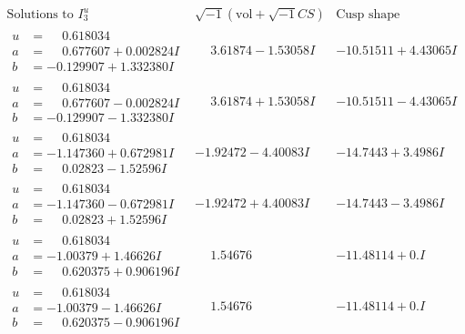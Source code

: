 \documentclass[1p]{elsarticle_modified}
\theoremstyle{definition}
\newcommand{\I}{\sqrt{-1}}
\begin{document}
$$\begin{array}{c|c|c}  
\text{Solutions to }I^u_{3}& \I (\text{vol} + \sqrt{-1}CS) & \text{Cusp shape}\\
 \hline 
\begin{aligned}
u &= \phantom{-}0.618034\phantom{ +0.000000I} \\
a &= \phantom{-}0.677607 + 0.002824 I \\
b &= -0.129907 + 1.332380 I\end{aligned}
 & \phantom{-}3.61874 - 1.53058 I & -10.51511 + 4.43065 I \\ \hline\begin{aligned}
u &= \phantom{-}0.618034\phantom{ +0.000000I} \\
a &= \phantom{-}0.677607 - 0.002824 I \\
b &= -0.129907 - 1.332380 I\end{aligned}
 & \phantom{-}3.61874 + 1.53058 I & -10.51511 - 4.43065 I \\ \hline\begin{aligned}
u &= \phantom{-}0.618034\phantom{ +0.000000I} \\
a &= -1.147360 + 0.672981 I \\
b &= \phantom{-}0.02823 - 1.52596 I\end{aligned}
 & -1.92472 - 4.40083 I & -14.7443 + 3.4986 I \\ \hline\begin{aligned}
u &= \phantom{-}0.618034\phantom{ +0.000000I} \\
a &= -1.147360 - 0.672981 I \\
b &= \phantom{-}0.02823 + 1.52596 I\end{aligned}
 & -1.92472 + 4.40083 I & -14.7443 - 3.4986 I \\ \hline\begin{aligned}
u &= \phantom{-}0.618034\phantom{ +0.000000I} \\
a &= -1.00379 + 1.46626 I \\
b &= \phantom{-}0.620375 + 0.906196 I\end{aligned}
 & \phantom{-}1.54676\phantom{ +0.000000I} & -11.48114 + 0. I\phantom{ +0.000000I} \\ \hline\begin{aligned}
u &= \phantom{-}0.618034\phantom{ +0.000000I} \\
a &= -1.00379 - 1.46626 I \\
b &= \phantom{-}0.620375 - 0.906196 I\end{aligned}
 & \phantom{-}1.54676\phantom{ +0.000000I} & -11.48114 + 0. I\phantom{ +0.000000I} \\ \hline\begin{aligned}

\end{aligned}
\end{array}$$
\end{document}
